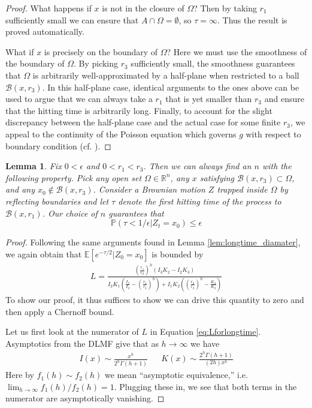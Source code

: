 \documentclass[12pt, nofootinbib,english, amsmath, amssymb, aps, priprint, graphicx,floatfix]{revtex4-1}
\newtheorem{lemma}{Lemma}
\theoremstyle{plain}
\theoremstyle{definition}
\theoremstyle{plain}
\newcommand{\bb}[1]{\mathcal{B}\left(#1\right)}
\begin{document}
{\begin{proof}
What happens if $x$ is not in the closure of $\Omega$?  Then by taking $r_1$ sufficiently small we can ensure that $A \cap \Omega = \emptyset$, so $\tau = \infty$.  Thus the result is proved automatically.

What if $x$ is precisely on the boundary of $\Omega$?  Here we must use the smoothness of the boundary of $\Omega$.  By picking $r_3$ sufficiently small, the smoothness guarantees that $\Omega$ is arbitrarily well-approximated by a half-plane when restricted to a ball $\bb{x,r_3}$.  In this half-plane case, identical arguments to the ones above can be used to argue that we can always take a $r_1$ that is yet smaller than $r_3$ and ensure that the hitting time is arbitrarily long.  Finally, to account for the slight discrepancy between the half-plane case and the actual case for some finite $r_3$, we appeal to the continuity of the Poisson equation which governs $g$ with respect to boundary condition (cf. \cite{strang1972approximation}).
\end{proof}



\begin{lemma}
\label{lem:longtime} Fix $0<\epsilon$ and $0<r_1<r_3$.  Then we can always find an $n$ with the following property.  Pick any open set $\Omega \in \mathbb{R}^n$, any $x$ satisfying $\bb{x,r_3}\subset \Omega$, and any $x_0 \notin \bb{x,r_3}$.  Consider a Brownian motion $Z$ trapped inside $\Omega$ by reflecting boundaries and let $\tau$ denote the first hitting time of the process to $\bb{x,r_1}$.  Our choice of $n$ guarantees that
\[
\mathbb{P}(\tau < 1/\epsilon|Z_t=x_0) \leq \epsilon
\]
\end{lemma}
\begin{proof}
Following the same arguments found in Lemma \ref{lem:longtime_diamater}, we again obtain that $\mathbb{E}[e^{-\tau/2}|Z_0=x_0]$ is bounded by
\begin{gather}
L=\frac{\left(\frac{r_{1}}{r_{2}}\right)^{h}\left(I_{3}K_{2}-I_{2}K_{3}\right)}{I_{2}K_{1}\left(\frac{I_{3}}{I_{2}}-\left(\frac{r_{3}}{r_{2}}\right)^{h}\right)+I_{1}K_{2}\left(\left(\frac{r_{3}}{r_{2}}\right)^{h}-\frac{K_{3}}{K_{2}}\right)}
\end{gather}
To show our proof, it thus suffices to show we can drive this quantity to zero and then apply a Chernoff bound.

Let us first look at the numerator of $L$ in Equation \ref{eq:Lforlongtime}.  Asymptotics from the DLMF give that as $h \rightarrow \infty$ we have
\begin{align*}
I(x) \sim \frac{x^h}{2^h\Gamma(h+1)} & & K(x) \sim \frac{2^h\Gamma(h+1)}{(2h)x^h}
\end{align*}
Here by $f_1(h)\sim f_2(h)$ we mean ``asymptotic equivalence,'' i.e.\ $\lim_{h\rightarrow\infty}f_1(h)/f_2(h)=1$.  Plugging these in, we see that both terms in the numerator are asymptotically vanishing.


\end{proof}}
\end{document}
